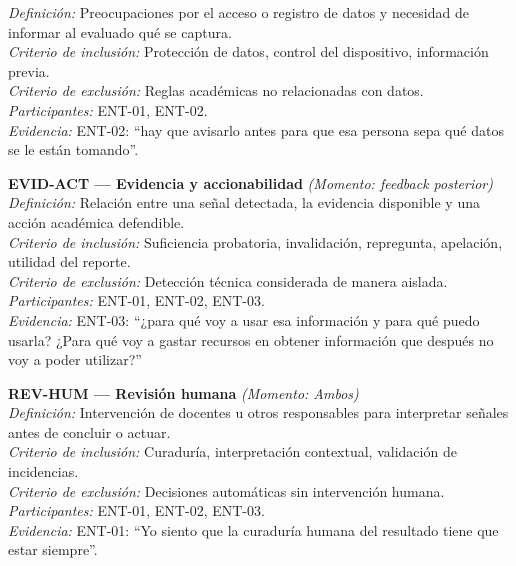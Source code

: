 \begin{center}
\begin{infobox}
\textit{Definición:} Preocupaciones por el acceso o registro de datos y necesidad de informar al evaluado qué se captura.\\
\textit{Criterio de inclusión:} Protección de datos, control del dispositivo, información previa.\\
\textit{Criterio de exclusión:} Reglas académicas no relacionadas con datos.\\
\textit{Participantes:} ENT-01, ENT-02.\\
\textit{Evidencia:} ENT-02: ``hay que avisarlo antes para que esa persona sepa qué datos se le están tomando''.
\end{infobox}
\vspace{2pt}
\begin{infobox}
\textbf{\textcolor{accent}{EVID-ACT --- Evidencia y accionabilidad}} \textit{(Momento: \textit{feedback} posterior)}\\
\textit{Definición:} Relación entre una señal detectada, la evidencia disponible y una acción académica defendible.\\
\textit{Criterio de inclusión:} Suficiencia probatoria, invalidación, repregunta, apelación, utilidad del reporte.\\
\textit{Criterio de exclusión:} Detección técnica considerada de manera aislada.\\
\textit{Participantes:} ENT-01, ENT-02, ENT-03.\\
\textit{Evidencia:} ENT-03: ``¿para qué voy a usar esa información y para qué puedo usarla? ¿Para qué voy a gastar recursos en obtener información que después no voy a poder utilizar?''
\end{infobox}
\vspace{2pt}
\begin{infobox}
\textbf{\textcolor{accent}{REV-HUM --- Revisión humana}} \textit{(Momento: Ambos)}\\
\textit{Definición:} Intervención de docentes u otros responsables para interpretar señales antes de concluir o actuar.\\
\textit{Criterio de inclusión:} Curaduría, interpretación contextual, validación de incidencias.\\
\textit{Criterio de exclusión:} Decisiones automáticas sin intervención humana.\\
\textit{Participantes:} ENT-01, ENT-02, ENT-03.\\
\textit{Evidencia:} ENT-01: ``Yo siento que la curaduría humana del resultado tiene que estar siempre''.
\end{infobox}

\end{center}
